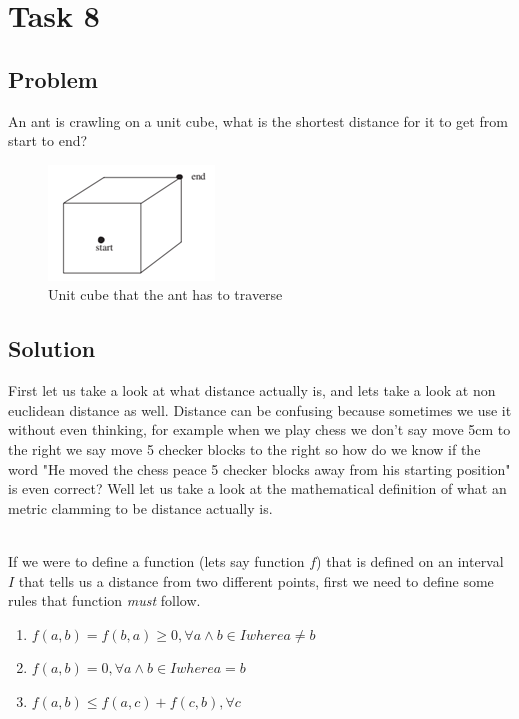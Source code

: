 \documentclass[a4paper, 10pt]{article}
\begin{document}
	\pagebreak
	\section{Task 8}
	
		\subsection{Problem}
			\noindent An ant is crawling on a unit cube, what is the shortest distance for it to get from start to end?
			
			\begin{figure}[h]
				\centering
				\includegraphics[scale = 1]{antsUnitCube}
				\caption{Unit cube that the ant has to traverse}
				\label{Fig:Ant's Unit Cube}
			\end{figure}
		\subsection{Solution}
			\noindent First let us take a look at what distance actually is, and lets take a look at non euclidean distance as well. Distance can be confusing because sometimes we use it without even thinking, for example when we play chess we don't say move 5cm to the right we say move 5 checker blocks to the right so how do we know if the word "He moved the chess peace 5 checker blocks away from his starting position" is even correct? Well let us take a look at the mathematical definition of what an metric clamming to be distance actually is.
			
			\\ \vspace{3mm} If we were to define a function (lets say function $f$) that is defined on an interval $I$ that tells us a distance from two different points, first we need to define some rules that function \emph{must} follow.
			
			\begin{enumerate}
				\item $f(a,b) = f(b,a) \geq 0 , \forall a \wedge b \in I where a \neq b$
				\item $f(a,b) \equal 0 , \forall a \wedge b \in I where a \equal b$
				\item $f(a,b) \leq f(a, c) + f(c , b), \forall c$
			\end{enumerate}
		
\end{document}
